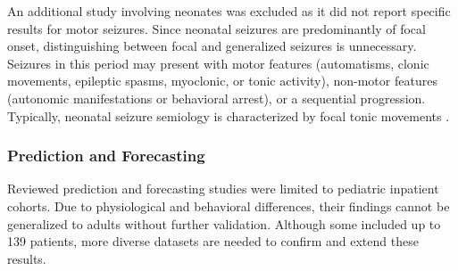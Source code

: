 An additional study \cite{Chen2023-ns} involving neonates was excluded as it did not report specific results for motor seizures. Since neonatal seizures are predominantly of focal onset, distinguishing between focal and generalized seizures is unnecessary. Seizures in this period may present with motor features (automatisms, clonic movements, epileptic spasms, myoclonic, or tonic activity), non-motor features (autonomic manifestations or behavioral arrest), or a sequential progression. Typically, neonatal seizure semiology is characterized by focal tonic movements \cite{Ziobro24-neo}.

\subsubsection{Prediction and Forecasting}
Reviewed prediction and forecasting studies were limited to pediatric inpatient cohorts. Due to physiological and behavioral differences, their findings cannot be generalized to adults without further validation. Although some included up to 139 patients, more diverse datasets are needed to confirm and extend these results.